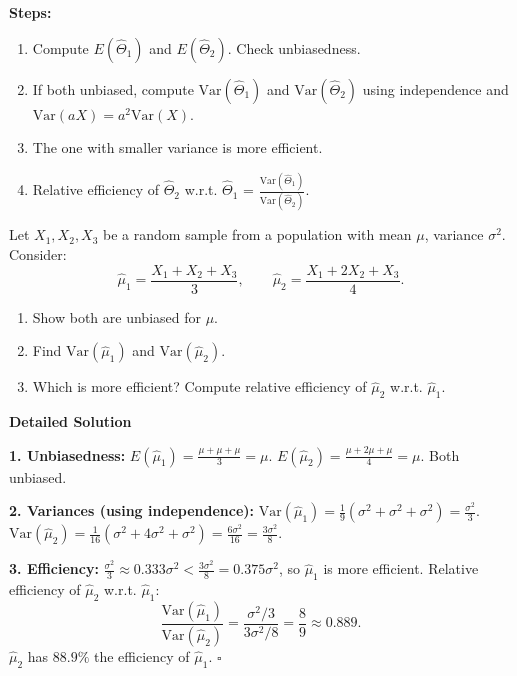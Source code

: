 \documentclass[11pt]{article}
\providecommand{\qed}{\hfill$\square$}
\begin{document}
\begin{methode}
\textbf{Steps:}
\begin{enumerate}
\item Compute $E(\hat{\Theta}_1)$ and $E(\hat{\Theta}_2)$. Check unbiasedness.
\item If both unbiased, compute $\mathrm{Var}(\hat{\Theta}_1)$ and $\mathrm{Var}(\hat{\Theta}_2)$ using independence and $\mathrm{Var}(aX) = a^2\mathrm{Var}(X)$.
\item The one with smaller variance is more efficient.
\item Relative efficiency of $\hat{\Theta}_2$ w.r.t. $\hat{\Theta}_1$ = $\frac{\mathrm{Var}(\hat{\Theta}_1)}{\mathrm{Var}(\hat{\Theta}_2)}$.
\end{enumerate}
\end{methode}

\begin{exoresolu}
Let $X_1,X_2,X_3$ be a random sample from a population with mean $\mu$, variance $\sigma^2$. Consider:
\[
\hat{\mu}_1 = \frac{X_1+X_2+X_3}{3},\qquad
\hat{\mu}_2 = \frac{X_1+2X_2+X_3}{4}.
\]
\begin{enumerate}
\item Show both are unbiased for $\mu$.
\item Find $\mathrm{Var}(\hat{\mu}_1)$ and $\mathrm{Var}(\hat{\mu}_2)$.
\item Which is more efficient? Compute relative efficiency of $\hat{\mu}_2$ w.r.t. $\hat{\mu}_1$.
\end{enumerate}
\tcblower
\textbf{Detailed Solution}

\textbf{1. Unbiasedness:}
$E(\hat{\mu}_1) = \frac{\mu+\mu+\mu}{3} = \mu$.
$E(\hat{\mu}_2) = \frac{\mu+2\mu+\mu}{4} = \mu$.
Both unbiased.

\textbf{2. Variances (using independence):}
$\mathrm{Var}(\hat{\mu}_1) = \frac{1}{9}(\sigma^2+\sigma^2+\sigma^2) = \frac{\sigma^2}{3}$.
$\mathrm{Var}(\hat{\mu}_2) = \frac{1}{16}(\sigma^2 + 4\sigma^2 + \sigma^2) = \frac{6\sigma^2}{16} = \frac{3\sigma^2}{8}$.

\textbf{3. Efficiency:}
$\frac{\sigma^2}{3} \approx 0.333\sigma^2 < \frac{3\sigma^2}{8} = 0.375\sigma^2$, so $\hat{\mu}_1$ is more efficient.
Relative efficiency of $\hat{\mu}_2$ w.r.t. $\hat{\mu}_1$:
\[
\frac{\mathrm{Var}(\hat{\mu}_1)}{\mathrm{Var}(\hat{\mu}_2)} = \frac{\sigma^2/3}{3\sigma^2/8} = \frac{8}{9} \approx 0.889.
\]
$\hat{\mu}_2$ has $88.9\%$ the efficiency of $\hat{\mu}_1$. \qed
\end{exoresolu}
\end{document}
